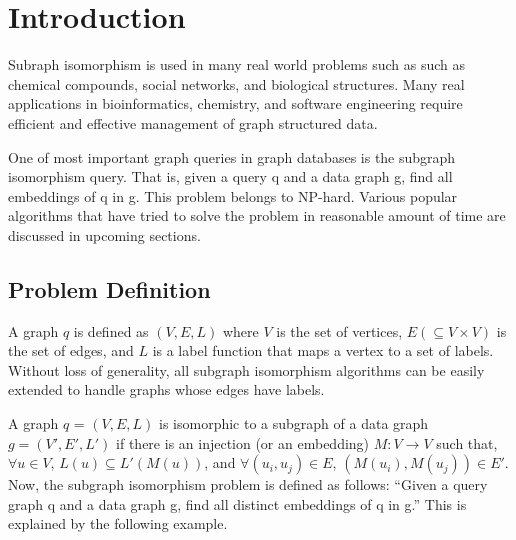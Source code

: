 \documentclass[
10pt, %
a4paper, %
oneside, %
headinclude,footinclude, %
BCOR5mm, %
]{scrartcl}
\begin{document}

\let\thefootnote\relax{}



\newpage %


\section{Introduction}

Subraph isomorphism is used in many real world problems such as such as chemical compounds, social networks, and biological structures. Many real applications in bioinformatics, chemistry, and software engineering require efficient and effective management of graph structured data.

One of most important graph queries in graph databases is the subgraph isomorphism query. That is, given a query q and a data graph g, find all embeddings of q in g. This problem belongs to NP-hard. Various popular algorithms that have tried to solve the problem in reasonable amount of time are discussed in upcoming sections.

\subsection{Problem Definition}
A graph $q$ is defined as $(V, E,L)$ where $V$ is the set of vertices, $E(\subseteq V \times V)$ is the set of edges, and $L$ is a label function that maps a vertex to a set of labels. Without loss of generality, all subgraph isomorphism algorithms can be easily extended to handle graphs whose edges have labels.

A graph $q$ = $(V, E,L)$ is isomorphic to a subgraph of a data graph $g = (V', E', L')$ if there is an injection (or an embedding) $M : V \rightarrow V$ such that, $\forall u \in V $, $L(u) \subseteq L' (M(u))$, and $\forall (u_i, u_j) \in E$, $(M(u_i), M(u_j)) \in E'$.\\
Now, the subgraph isomorphism problem is defined as follows: “Given a query graph q and a data graph g, find all distinct embeddings of q in g.” This is explained by the following example.
\end{document}
